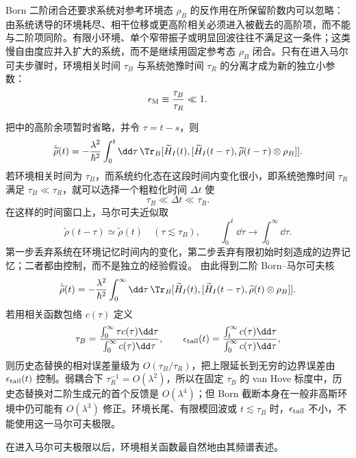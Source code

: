 Born 二阶闭合还要求系统对参考环境态 $\rho_B$ 的反作用在所保留阶数内可以忽略：由系统诱导的环境耗尽、相干位移或更高阶相关必须进入被截去的高阶项，而不能与二阶项同阶。有限小环境、单个窄带振子或明显回波往往不满足这一条件；这类慢自由度应并入扩大的系统，而不是继续用固定参考态 $\rho_B$ 闭合。只有在进入马尔可夫步骤时，环境相关时间 $\tau_B$ 与系统弛豫时间 $\tau_R$ 的分离才成为新的独立小参数：
\begin{equation}
\epsilon_{\rm M}\equiv\frac{\tau_B}{\tau_R}\ll1.
\label{eq:phys-oqs-markov-memory-parameter}
\end{equation}

把中的高阶余项暂时省略，并令
\(\tau=t-s\)，则
\[
\dot{\widetilde\rho}(t)
=-\frac{\lambda^2}{\hbar^2}
\int_0^t\dd\tau\,
\Tr_B
[\widetilde H_I(t),
[\widetilde H_I(t-\tau),
\widetilde\rho(t-\tau)\otimes\rho_B]].
\]
若环境相关时间为 $\tau_B$，而系统约化态在这段时间内变化很小，即系统弛豫时间 $\tau_R$ 满足 $\tau_B\ll\tau_R$，就可以选择一个粗粒化时间 $\Delta t$ 使
\begin{equation}
\tau_B\ll\Delta t\ll\tau_R.
\label{eq:phys-oqs-markov-coarse-graining}
\end{equation}
在这样的时间窗口上，马尔可夫近似取
\[
\widetilde\rho(t-\tau)\simeq\widetilde\rho(t)
\quad(\tau\lesssim\tau_B),
\qquad
\int_0^t\dd\tau\longrightarrow\int_0^\infty\dd\tau.
\]
第一步丢弃系统在环境记忆时间内的变化，第二步丢弃有限初始时刻造成的边界记忆；二者都由控制，而不是独立的经验假设。
由此得到二阶 Born--马尔可夫核
\begin{equation}
\dot{\widetilde\rho}(t)
=-\frac{\lambda^2}{\hbar^2}
\int_0^\infty\dd\tau\,
\Tr_B
[\widetilde H_I(t),
[\widetilde H_I(t-\tau),
\widetilde\rho(t)\otimes\rho_B]].
\label{eq:phys-oqs-born-markov-kernel}
\end{equation}
若用相关函数包络 $c(\tau)$ 定义
\[
\tau_B=\frac{\int_0^\infty \tau c(\tau)\dd\tau}{\int_0^\infty c(\tau)\dd\tau},
\qquad
\epsilon_{\rm tail}(t)=
\frac{\int_t^\infty c(\tau)\dd\tau}{\int_0^\infty c(\tau)\dd\tau},
\]
则历史态替换的相对误差量级为 $O(\tau_B/\tau_R)$，把上限延长到无穷的边界误差由 $\epsilon_{\rm tail}(t)$ 控制。弱耦合下 $\tau_R^{-1}=O(\lambda^2)$，所以在固定 $\tau_B$ 的 van Hove 标度中，历史态替换对二阶生成元的首个反馈是 $O(\lambda^4)$；但 Born 截断本身在一般非高斯环境中仍可能有 $O(\lambda^3)$ 修正。环境长尾、有限模回波或 $t\lesssim\tau_B$ 时，$\epsilon_{\rm tail}$ 不小，不能使用这一马尔可夫极限。

在进入马尔可夫极限以后，环境相关函数最自然地由其频谱表述。

